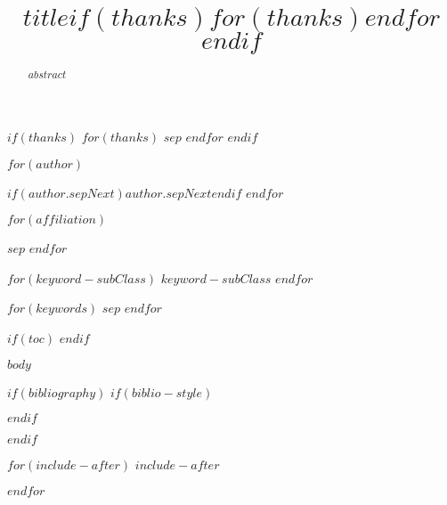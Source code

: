 \documentclass[$journal$]{imsart}
\numberwithin{equation}{section}
\theoremstyle{plain}
\theoremstyle{remark}
\begin{document}
\begin{frontmatter}
\title{$title$$if(thanks)$$for(thanks)$$endfor$$endif$}

$if(thanks)$
$for(thanks)$
$sep$
$endfor$
$endif$


\begin{aug}


$for(author)$
\author[$author.addressLabel$]{ 
  }
  $if(author.sepNext)$$author.sepNext$$endif$
$endfor$

$for(affiliation)$
\address[$affiliation.label$]{$affiliation.name$,
  }
$sep$
$endfor$
\end{aug}

\begin{abstract}
$abstract$
\end{abstract}


$for(keyword-subClass)$
$keyword-subClass$
$endfor$

\begin{keyword}
$for(keywords)$
$sep$
$endfor$
\end{keyword}

\end{frontmatter}

$if(toc)$
\tableofcontents
$endif$

$body$

$if(bibliography)$
$if(biblio-style)$

$endif$

$endif$

$for(include-after)$
$include-after$

$endfor$
\end{document}
